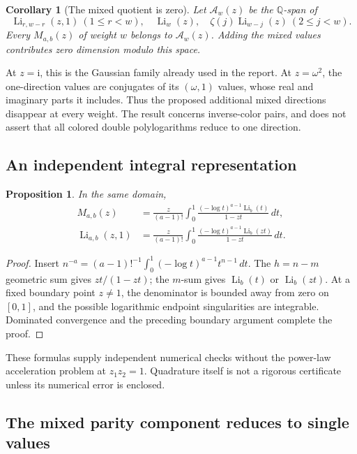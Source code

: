 \documentclass[11pt]{article}
\newtheorem{proposition}[theorem]{Proposition}
\newtheorem{corollary}[theorem]{Corollary}
\theoremstyle{definition}
\theoremstyle{remark}
\newcommand{\Li}{\operatorname{Li}}
\newcommand{\ii}{\mathrm{i}}
\newcommand{\Q}{\mathbb{Q}}
\begin{document}
\begin{corollary}[The mixed quotient is zero]\label{cor:mixedzero}
Let \(\mathcal A_w(z)\) be the \(\Q\)-span of
\[
\Li_{r,w-r}(z,1)\ (1\le r<w),\quad
\Li_w(z),\quad \zeta(j)\Li_{w-j}(z)\ (2\le j<w).
\]
Every \(M_{a,b}(z)\) of weight \(w\) belongs to \(\mathcal A_w(z)\).
Adding the mixed values contributes zero dimension modulo this space.
\end{corollary}

At \(z=\ii\), this is the Gaussian family already used in the report.
At \(z=\omega^2\), the one-direction values are conjugates of its
\((\omega,1)\) values, whose real and imaginary parts it includes.
Thus the proposed additional mixed directions disappear at every
weight. The result concerns inverse-color pairs, and does not assert
that all colored double polylogarithms reduce to one direction.

\subsection{An independent integral representation}

\begin{proposition}\label{prop:mixedintegral}
In the same domain,
\begin{align}
M_{a,b}(z)&=\frac{z}{(a-1)!}\int_0^1
 \frac{(-\log t)^{a-1}\Li_b(t)}{1-zt}\,dt,
\label{eq:mixedintegral}\\
\Li_{a,b}(z,1)&=\frac{z}{(a-1)!}\int_0^1
 \frac{(-\log t)^{a-1}\Li_b(zt)}{1-zt}\,dt.
\label{eq:directionintegral}
\end{align}
\end{proposition}
\begin{proof}
Insert
\(n^{-a}=(a-1)!^{-1}\int_0^1(-\log t)^{a-1}t^{n-1}\,dt\).
The \(h=n-m\) geometric sum gives \(zt/(1-zt)\);
the \(m\)-sum gives \(\Li_b(t)\) or \(\Li_b(zt)\).
At a fixed boundary point \(z\ne1\), the denominator is bounded away
from zero on \([0,1]\), and the possible logarithmic endpoint
singularities are integrable. Dominated convergence and the preceding
boundary argument complete the proof.
\end{proof}

These formulas supply independent numerical checks without the
power-law acceleration problem at \(z_1z_2=1\). Quadrature itself is
not a rigorous certificate unless its numerical error is enclosed.

\subsection{The mixed parity component reduces to single values}
\end{document}
